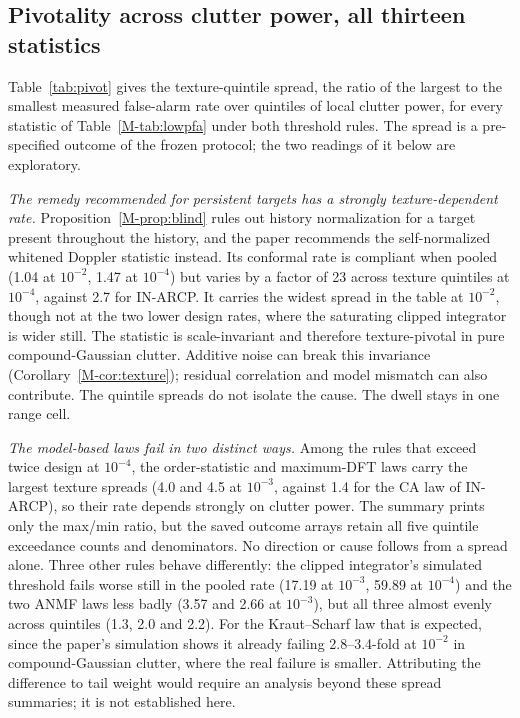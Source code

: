 \documentclass[10pt]{article}
\begin{document}
\subsection{Pivotality across clutter power, all thirteen statistics}\label{sup:pivot}
Table~\ref{tab:pivot} gives the texture-quintile spread, the ratio of the largest to the
smallest measured false-alarm rate over quintiles of local clutter power, for every statistic
of Table~\ref{M-tab:lowpfa} under both threshold rules. The spread is a pre-specified outcome
of the frozen protocol; the two readings of it below are exploratory.

\emph{The remedy recommended for persistent targets has a strongly texture-dependent rate.}
Proposition~\ref{M-prop:blind} rules out history normalization for a target present throughout
the history, and the paper recommends the self-normalized whitened Doppler statistic instead.
Its conformal rate is compliant when pooled (1.04 at $10^{-2}$, 1.47 at $10^{-4}$) but varies
by a factor of 23 across texture quintiles at $10^{-4}$, against 2.7 for
IN-ARCP. It carries the widest spread in the table at $10^{-2}$, though not at the two lower
design rates, where the saturating clipped integrator is wider still. The statistic is scale-invariant and therefore texture-pivotal in pure
compound-Gaussian clutter. Additive noise can break this invariance
(Corollary~\ref{M-cor:texture}); residual correlation and model mismatch can also contribute.
The quintile spreads do not isolate the cause. The dwell stays in one range cell.

\emph{The model-based laws fail in two distinct ways.} Among the rules that exceed twice design
at $10^{-4}$, the order-statistic and maximum-DFT laws carry the largest texture spreads
(4.0 and 4.5 at $10^{-3}$, against 1.4 for the CA law of IN-ARCP), so their
rate depends strongly on clutter power. The summary prints only the max/min ratio, but the saved outcome arrays retain all five
quintile exceedance counts and denominators. No direction or cause follows from a spread
alone. Three other rules behave differently:
the clipped integrator's simulated threshold fails worse still in the pooled rate (17.19 at
$10^{-3}$, 59.89 at $10^{-4}$) and the two ANMF laws less badly (3.57 and 2.66 at $10^{-3}$),
but all three almost evenly across quintiles (1.3, 2.0 and 2.2). For the
Kraut--Scharf law that is expected, since the paper's simulation shows it already failing
2.8--3.4-fold at $10^{-2}$ in compound-Gaussian clutter, where the real failure is smaller.
Attributing the difference to tail weight would require an analysis beyond these spread
summaries; it is not established here.
\end{document}
